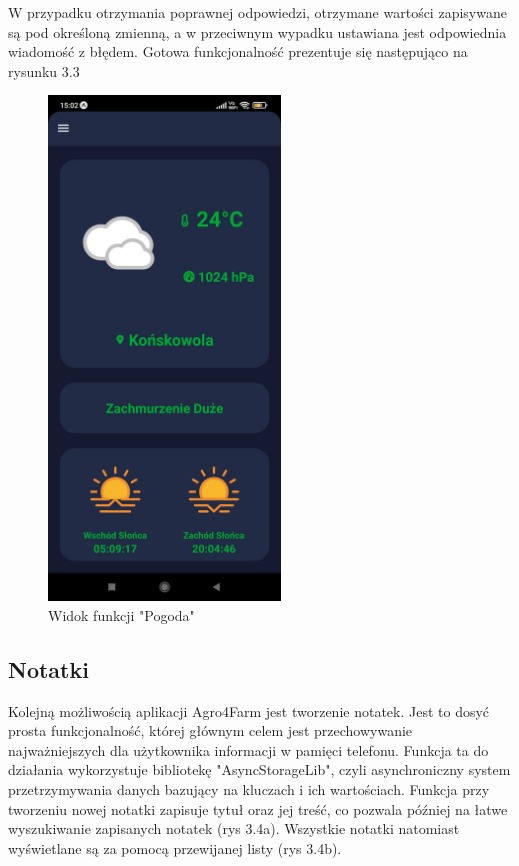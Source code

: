\documentclass[a4paper,12pt,oneside]{book}
\begin{document}
	\newpage
	
	W przypadku otrzymania poprawnej odpowiedzi, otrzymane wartości zapisywane są pod określoną zmienną, a w przeciwnym wypadku ustawiana jest odpowiednia wiadomość z błędem. Gotowa funkcjonalność prezentuje się następująco na rysunku 3.3
	
	\begin{figure}[H]
		\centering
		\includegraphics[width=0.55\textwidth]{grafika/pogoda.jpg}
		\caption{Widok funkcji "Pogoda"}
	\end{figure}
	
	\subsection{Notatki}
		Kolejną możliwością aplikacji Agro4Farm jest tworzenie notatek. Jest to dosyć prosta funkcjonalność, której głównym celem jest przechowywanie najważniejszych dla użytkownika informacji w pamięci telefonu. Funkcja ta do działania wykorzystuje bibliotekę "AsyncStorageLib", czyli asynchroniczny system przetrzymywania danych bazujący na kluczach i ich wartościach. Funkcja przy tworzeniu nowej notatki zapisuje tytuł oraz jej treść, co pozwala później na łatwe wyszukiwanie zapisanych notatek (rys 3.4a). Wszystkie notatki natomiast wyświetlane są za pomocą przewijanej listy (rys 3.4b).
		
\end{document}
